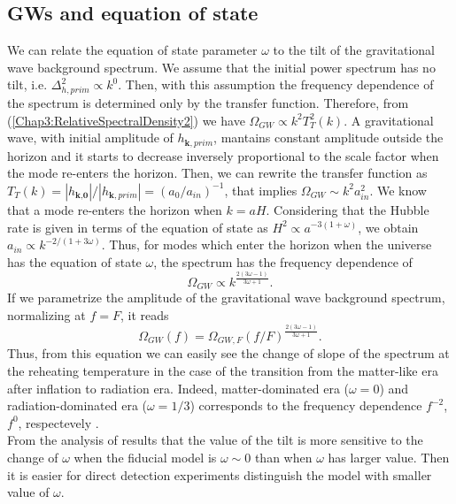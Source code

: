 \documentclass[11pt,a4paper,twoside]{book}
\begin{document}
\subsection{GWs and equation of state}
We can relate the equation of state parameter $\omega$ to the tilt of the gravitational wave background spectrum. We assume that the initial power spectrum has no tilt, i.e. $ \Delta_{h,prim}^{2} \propto k^{0} $. Then, with this assumption the frequency dependence of the spectrum is determined only by the transfer function. Therefore, from (\ref{Chap3:RelativeSpectralDensity2}) we have $\Omega_{GW} \propto k^{2}T^{2}_{T}(k)$.  A gravitational wave, with  initial amplitude of $ h_{\textbf{k},prim} $, mantains constant amplitude outside the horizon and it starts to decrease inversely proportional to the scale factor when the mode re-enters the horizon. Then, we can rewrite the transfer function as $ T_{T}(k) = |h_{\textbf{k,0}}|/|h_{\textbf{k},prim}| = (a_{0}/a_{in})^{-1} $, that implies $ \Omega_{GW} \sim k^{2}a^{2}_{in} $. We know that a mode re-enters the horizon  when $ k = aH $. Considering that the Hubble rate is given in terms of the equation of state as $ H^{2} \propto a^{-3(1+\omega)} $, we obtain $ a_{in} \propto k^{-2/(1+3\omega)} $. Thus, for modes which enter the horizon when the universe has the equation of state $\omega$, the spectrum has the frequency dependence of
\begin{equation}
	\label{Chap3:SpectrumFrequencyDependence}
	\Omega_{GW} \propto k^{\frac{2(3\omega - 1)}{3\omega + 1}}.
\end{equation} 
If we parametrize  the amplitude of the gravitational wave background spectrum, normalizing at $ f=F $, it reads
\begin{equation}
	\label{Chap3:SpectrumFrequencyDependenceParametrization}
	\Omega_{GW}(f) = \Omega_{GW,F}(f/F)^{\frac{2(3\omega - 1)}{3\omega + 1}}.
\end{equation}
Thus, from this equation we can easily see the change of slope of the spectrum at the reheating temperature in the case of the transition from the matter-like era after inflation to radiation era. Indeed, matter-dominated era ($ \omega=0 $) and radiation-dominated era ($\omega=1/3$) corresponds to the frequency dependence $ f^{-2} $, $ f^{0} $, respectevely \cite{Chap3:ProspectsForDeterminationWithDetectors}. \\
From the analysis of \cite{Chap3:ProspectsForDeterminationWithDetectors} results that the value of the tilt is more sensitive to the change of $\omega$ when the fiducial model is $ \omega \sim 0 $ than when $\omega$ has larger value. Then it is easier for direct detection experiments  distinguish the model with smaller value of $\omega$.
\end{document}
